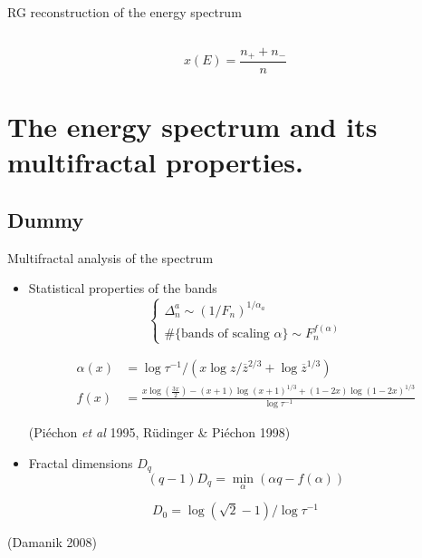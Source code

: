 \documentclass[xcolor=x11names,compress,professionalfonts]{beamer}
\renewcommand{\(}{\begin{columns}}
\renewcommand{\)}{\end{columns}}
\newcommand{\<}[1]{\begin{column}{#1}}
\renewcommand{\>}{\end{column}}
\newcommand{\zb}{\ensuremath{\overline{z}}}
\begin{document}
\begin{frame}{RG reconstruction of the energy spectrum}
\begin{columns}
\begin{column}{6cm}
	\end{column}
	\end{columns}
	\[ 
		x(E) = \frac{n_+ + n_-}{n} 
	\]
\end{frame}

\section{The energy spectrum and its multifractal properties.}
\subsection{Dummy}
\begin{frame}{Multifractal analysis of the spectrum}

%	
%

	\begin{itemize}
		\item 	Statistical properties of the bands
		\[
	\begin{cases}
	\Delta_n^a \sim (1/F_n)^{1/\alpha_a} \\
	\#\{\text{bands of scaling~} \alpha \} \sim F_n^{f(\alpha)} 
	\end{cases}
	\]
	
		\begin{align*}
		\alpha(x) &= \log \tau^{-1}/\left( x \log z/\zb^{2/3} + \log \zb^{1/3} \right) \\
		f(x) &= \frac{x \log \left(\frac{3 x}{2}\right)- (x+1) \log (x+1)^{1/3}+ (1-2 x) \log (1-2 x)^{1/3}}{\log \tau^{-1}}
	\end{align*}
	\begin{flushright}
	(Piéchon \emph{et al} 1995, Rüdinger \& Piéchon 1998)
	\end{flushright}
		\item Fractal dimensions $D_q$
			\[
				(q-1)D_q = \min_\alpha(\alpha q - f(\alpha))
			\]
	\end{itemize}
	\[ D_0 = \log(\sqrt{2}-1) / \log \tau^{-1} \]
	\begin{flushright}
	(Damanik 2008)
	\end{flushright}
\end{frame}
\end{document}
